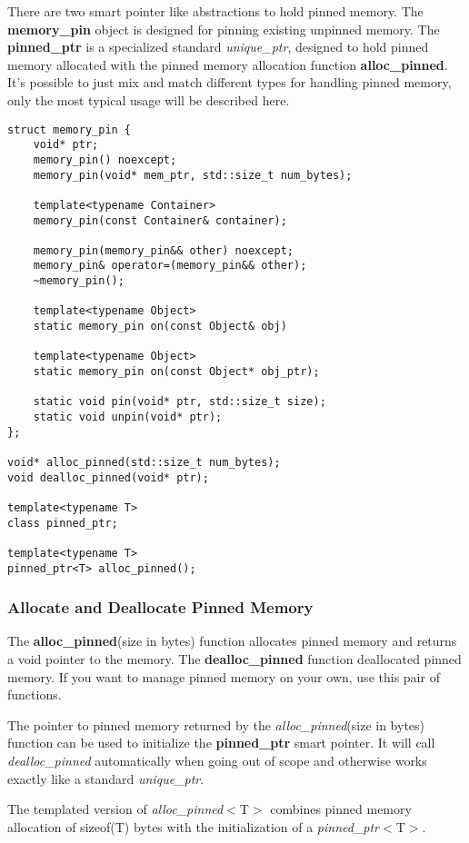 \documentclass[a4paper,10pt]{article}
\begin{document}
There are two smart pointer like abstractions to hold pinned memory. The \textbf{memory\_pin} object is designed for pinning existing unpinned memory. The \textbf{pinned\_ptr} is a specialized standard \emph{unique\_ptr}, designed to hold pinned memory allocated with the pinned memory allocation function \textbf{alloc\_pinned}. It's possible to just mix and match different types for handling pinned memory, only the most typical usage will be described here.
%
\begin{lstlisting}
struct memory_pin {
    void* ptr;
    memory_pin() noexcept;
    memory_pin(void* mem_ptr, std::size_t num_bytes);

    template<typename Container>
    memory_pin(const Container& container);

    memory_pin(memory_pin&& other) noexcept;
    memory_pin& operator=(memory_pin&& other);
    ~memory_pin();

    template<typename Object>
    static memory_pin on(const Object& obj)

    template<typename Object>
    static memory_pin on(const Object* obj_ptr);

    static void pin(void* ptr, std::size_t size);
    static void unpin(void* ptr);
};

void* alloc_pinned(std::size_t num_bytes);
void dealloc_pinned(void* ptr);

template<typename T>
class pinned_ptr;

template<typename T>
pinned_ptr<T> alloc_pinned();
\end{lstlisting}

\subsubsection{Allocate and Deallocate Pinned Memory}

The \textbf{alloc\_pinned}(size in bytes) function allocates pinned memory and returns a void pointer to the memory. The \textbf{dealloc\_pinned} function deallocated pinned memory. If you want to manage pinned memory on your own, use this pair of functions.

The pointer to pinned memory returned by the \emph{alloc\_pinned}(size in bytes) function can be used to initialize the \textbf{pinned\_ptr} smart pointer. It will call \emph{dealloc\_pinned} automatically when going out of scope and otherwise works exactly like a standard \emph{unique\_ptr}.

The templated version of \emph{alloc\_pinned}$<$T$>$ combines pinned memory allocation of sizeof(T) bytes with the initialization of a \emph{pinned\_ptr}$<$T$>$.
\end{document}

